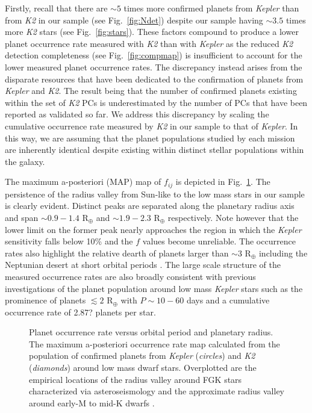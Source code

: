 \documentclass[twocolumn]{emulateapj}
\newcommand{\kepler}[1]{\emph{Kepler}#1}
\newcommand{\ktwo}[1]{\emph{K2}#1}
\begin{document}
Firstly, recall that there are $\sim 5$ times more confirmed planets from \kepler{} than from \ktwo{}
in our sample
(see Fig.~\ref{fig:Ndet}) despite our sample having $\sim 3.5$ times more \ktwo{} stars 
(see Fig.~\ref{fig:stars}). These factors compound to produce a lower planet occurrence rate measured
with \ktwo{} than with \kepler{} as the reduced \ktwo{} detection completeness %
(see Fig.~\ref{fig:compmap}) is insufficient to account for the lower measured
planet occurrence rates. The discrepancy instead arises from the disparate resources that have
been dedicated to the confirmation of planets from \kepler{} and \ktwo{.} The result being that
the number of confirmed planets existing within the set of \ktwo{} PCs is underestimated
by the number of PCs that have been reported as validated so far. We address this discrepancy
by scaling the cumulative occurrence rate measured by \ktwo{} in our sample to that of \kepler{.}
In this way, we are assuming that the planet populations studied by each mission are inherently
identical despite existing within distinct stellar populations within the galaxy.

The maximum a-posteriori (MAP) map of $f_{ij}$ is depicted in Fig.~\ref{fig:fmap}.
The persistence of the radius valley from Sun-like to the low mass stars in our sample is clearly
evident. Distinct peaks are separated along the planetary radius axis and span
$\sim 0.9-1.4$ R$_{\oplus}$ and $\sim 1.9-2.3$ R$_{\oplus}$ respectively.
Note however that the lower limit on the former peak nearly
approaches the region in which the \kepler{} sensitivity falls below 10\% and the $f$ values become
unreliable. %
The occurrence rates also highlight the relative dearth of planets larger than $\sim 3$ R$_{\oplus}$
including the Neptunian desert at short orbital periods \citep{lundkvist16,mazeh16}. The large scale
structure of the measured occurrence rates are also broadly consistent with previous investigations
of the planet population around low mass \kepler{} stars \citep{dressing13,dressing15a,gaidos16} such
as the prominence of planets $\lesssim 2$ R$_{\oplus}$ with $P \sim 10-60$ days and a cumulative
occurrence rate of 2.87? planets per star.

\begin{figure}
  \centering
  \caption{Planet occurrence rate versus orbital period and planetary radius. The maximum a-posteriori occurrence
    rate map calculated from the population of confirmed planets from \kepler{} (\emph{circles}) and
    \ktwo{} (\emph{diamonds}) around low mass dwarf
    stars. Overplotted are the empirical locations of the radius valley around FGK stars 
    characterized via asteroseismology \citep[\emph{dashed line},][]{vaneylen18} and the approximate radius
    valley around early-M to mid-K dwarfs \citep[\emph{dotted line},][]{wu19}.}
  \label{fig:fmap}
\end{figure}
\end{document}
